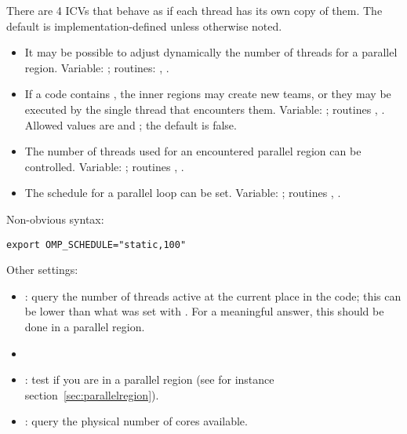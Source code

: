 There are 4 \acp{ICV} that behave as if each thread has its own copy of them.
The default is implementation-defined unless otherwise noted.
\begin{itemize}
  \item It may be possible to adjust dynamically the number of threads
    for a parallel region. Variable: ;
    routines: ,
    .
  \item If a code contains ,
    the inner regions may create new teams, or they may be executed by
    the single thread that encounters them. Variable:
    ; routines ,
    . Allowed values are  and
    ; the default is false.
  \item The number of threads used for an encountered parallel region
    can be controlled. Variable: ;
    routines ,
    .
  \item The schedule for a parallel loop can be set. Variable:
    ; routines
    , .
\end{itemize}

Non-obvious syntax:
\begin{verbatim}
export OMP_SCHEDULE="static,100"
\end{verbatim}

Other settings:
\begin{itemize}
\item{}: query the number of threads
  active at the current place in the code; this can be lower than what
  was set with . For a meaningful answer, this
  should be done in a parallel region.
\item{}
\item{}: test if you are in a parallel
  region (see for instance section~\ref{sec:parallelregion}).
\item{}: query the physical number of cores available.
\end{itemize}

